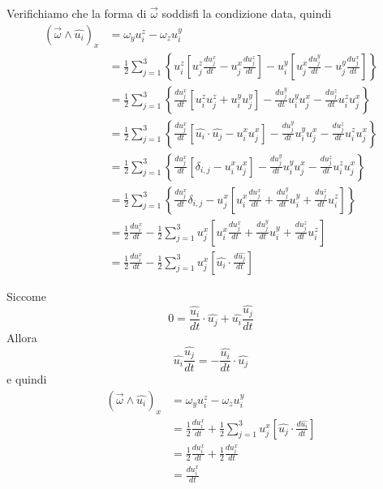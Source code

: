 \documentclass[a4paper]{article}
\begin{document}
Verifichiamo che la forma di \(\vec{\omega}\) soddisfi la condizione data, quindi
\begin{align*}
    (\vec{\omega} \wedge \hat{u_i})_x &= \omega_y u_i^z - \omega_z u_i^y \\
    &= \frac{1}{2} \sum_{j=1}^3 \left\{ u_i^z \left[u_j^z \frac{du_j^x}{dt} - u_j^x \frac{du_j^z}{dt}\right]
     - u_i^y \left[u_j^x \frac{du_j^y}{dt} - u_j^y \frac{du_j^x}{dt}\right] \right\} \\
     &= \frac{1}{2} \sum_{j=1}^3 \left\{
        \frac{du_j^x}{dt} \left[
            u_i^z u_j^z + u_i^yu_j^y
        \right]
        - \frac{du_j^y}{dt} u_i^yu_j^x - \frac{du_j^z}{dt} u_i^zu_j^x
     \right\} \\
     &= \frac{1}{2} \sum_{j=1}^3 \left\{
        \frac{du_j^x}{dt} \left[
            \hat{u_i} \cdot \hat{u_j} - u_i^x u_j^x
        \right]
        - \frac{du_j^y}{dt} u_i^yu_j^x - \frac{du_j^z}{dt} u_i^zu_j^x
     \right\} \\
     &= \frac{1}{2} \sum_{j=1}^3 \left\{
        \frac{du_j^x}{dt} \left[
            \delta_{i,j} - u_i^x u_j^x
        \right]
        - \frac{du_j^y}{dt} u_i^yu_j^x - \frac{du_j^z}{dt} u_i^zu_j^x
     \right\} \\
     &= \frac{1}{2} \sum_{j=1}^3 \left\{
        \frac{du_j^x}{dt} \delta_{i,j} - u_j^x \left[
            u_i^x \frac{du_j^x}{dt} + \frac{du_j^y}{dt} u_i^y + \frac{du_j^z}{dt} u_i^z
        \right]
     \right\} \\
     &= \frac{1}{2} \frac{du_i^x}{dt} - \frac{1}{2} \sum_{j=1}^3
        u_j^x \left[
            u_i^x \frac{du_j^x}{dt} + \frac{du_j^y}{dt} u_i^y + \frac{du_j^z}{dt} u_i^z
        \right] \\
    &= \frac{1}{2} \frac{du_i^x}{dt} - \frac{1}{2} \sum_{j=1}^3
        u_j^x \left[
            \hat{u_i} \cdot \frac{d\hat{u_j}}{dt}
        \right]
\end{align*}

Siccome
\[
    0 = \frac{\hat{u_i}}{dt} \cdot \hat{u_j} + \hat{u_i} \frac{\hat{u_j}}{dt}
\]
Allora
\[
    \hat{u_i} \frac{\hat{u_j}}{dt} = - \frac{\hat{u_i}}{dt} \cdot \hat{u_j}
\]
e quindi
\begin{align*}
    (\vec{\omega} \wedge \hat{u_i})_x &= \omega_y u_i^z - \omega_z u_i^y \\
    &= \frac{1}{2} \frac{du_i^x}{dt} + \frac{1}{2} \sum_{j=1}^3
    u_j^x \left[
        \hat{u_j} \cdot \frac{d\hat{u_i}}{dt}
    \right] \\
    &= \frac{1}{2} \frac{du_i^x}{dt} + \frac{1}{2} \frac{du_i^x}{dt} \\
    &= \frac{du_i^x}{dt}
\end{align*}
\end{document}
